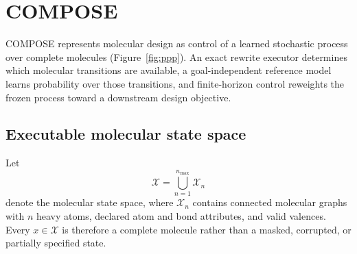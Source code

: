 %
%
%
%
%

\section{COMPOSE}
\label{sec:method}

COMPOSE represents molecular design as control of a learned stochastic process
over complete molecules (Figure~\ref{fig:ppp}). An exact rewrite executor
determines which molecular transitions are available, a goal-independent
reference model learns probability over those transitions, and finite-horizon
control reweights the frozen process toward a downstream design objective.

\subsection{Executable molecular state space}
\label{sec:gem-support}

Let
\[
  \mathcal X=\bigcup_{n=1}^{n_{\max}}\mathcal X_n
\]
denote the molecular state space, where $\mathcal X_n$ contains connected
molecular graphs with $n$ heavy atoms, declared atom and bond attributes, and
valid valences. Every $x\in\mathcal X$ is therefore a complete molecule rather
than a masked, corrupted, or partially specified state.

